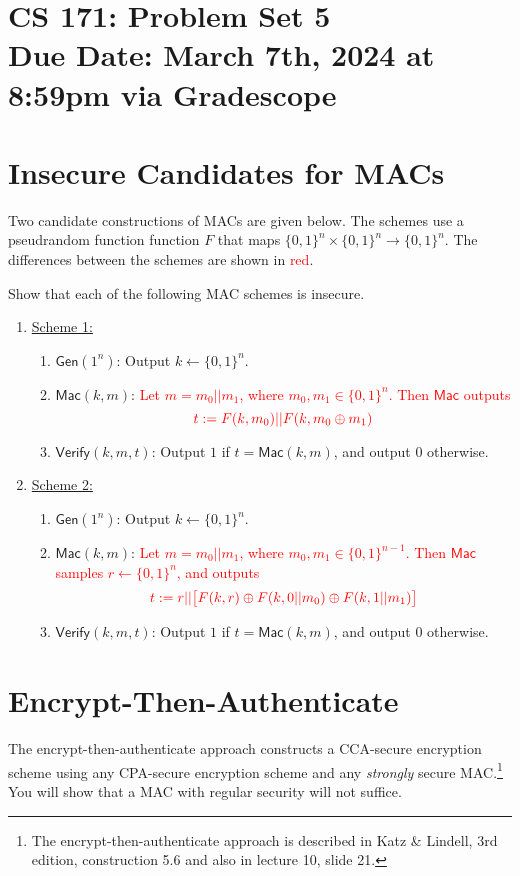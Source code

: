 \documentclass[11pt]{article}
\numberwithin{equation}{section}
\newcommand{\Gen}{\mathsf{Gen}}
\newcommand{\bin}{\{0,1\}}
\newcommand{\bit}{\bin}
\newcommand{\duedate}{March 7th, 2024 at 8:59pm via Gradescope}
\newcommand{\mac}{\mathsf{Mac}}
\newcommand{\verify}{\mathsf{Verify}}
\begin{document}
\section*{CS 171: Problem Set 5\\ {\small Due Date: \duedate} }

\section{Insecure Candidates for MACs}
Two candidate constructions of MACs are given below. The schemes use a pseudrandom function function $F$ that maps $\bit^n\times \bit^n \rightarrow \bit^n$. The differences between the schemes are shown in \textcolor{red}{red}.

Show that each of the following MAC schemes is insecure.

\begin{enumerate}
    \item \underline{Scheme 1:}
    \begin{enumerate}
        \item $\Gen(1^n)$: Output $k \leftarrow \{0,1\}^n$.
        \item $\mac(k, m)$: \textcolor{red}{Let $m = m_0 || m_1$, where $m_0, m_1 \in \{0,1\}^{n}$. Then $\mac$ outputs} 
        \[\textcolor{red}{t := F(k, m_0) || F(k, m_0 \oplus m_1)}\]
        \item $\verify(k, m, t)$: Output $1$ if $t = \mac(k, m)$, and output $0$ otherwise.
    \end{enumerate}

    \item \underline{Scheme 2:}
    \begin{enumerate}
        \item $\Gen(1^n)$: Output $k \leftarrow \{0,1\}^n$.
        \item $\mac(k, m)$: \textcolor{red}{Let $m = m_0 || m_1$, where $m_0, m_1 \in \{0,1\}^{n-1}$. Then $\mac$ samples $r \leftarrow \bit^{n}$, and outputs} \[\textcolor{red}{t:= r || \big[F(k, r) \oplus F(k, 0||m_0) \oplus F(k, 1||m_1)\big]}\]
        \item $\verify(k, m, t)$: Output $1$ if $t = \mac(k, m)$, and output $0$ otherwise.
    \end{enumerate}
\end{enumerate}

\pagebreak


\section{Encrypt-Then-Authenticate}
The encrypt-then-authenticate approach constructs a CCA-secure encryption scheme using any CPA-secure encryption scheme and any \textit{strongly} secure MAC.\footnote{The encrypt-then-authenticate approach is described in Katz \& Lindell, 3rd edition, construction 5.6 and also in lecture 10, slide 21.} You will show that a MAC with regular security will not suffice.
\end{document}
